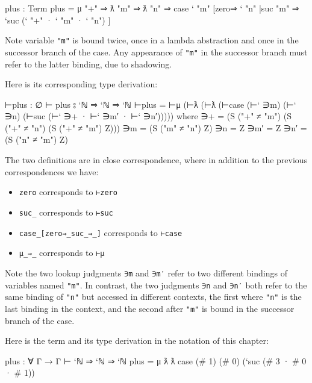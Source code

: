 \begin{myDisplay}
plus : Term
plus = μ "+" ⇒ ƛ "m" ⇒ ƛ "n" ⇒
         case ` "m"
           [zero⇒ ` "n"
           |suc "m" ⇒ `suc (` "+" · ` "m" · ` "n") ]
\end{myDisplay}

Note variable \texttt{"m"} is bound twice, once in a lambda abstraction
and once in the successor branch of the case. Any appearance of
\texttt{"m"} in the successor branch must refer to the latter binding,
due to shadowing.

Here is its corresponding type derivation:

\begin{myDisplay}
⊢plus : ∅ ⊢ plus ⦂ `ℕ ⇒ `ℕ ⇒ `ℕ
⊢plus = ⊢μ (⊢ƛ (⊢ƛ (⊢case (⊢` ∋m) (⊢` ∋n)
         (⊢suc (⊢` ∋+ · ⊢` ∋m′ · ⊢` ∋n′)))))
  where
  ∋+  = (S ("+" ≠ "m") (S ("+" ≠ "n") (S ("+" ≠ "m") Z)))
  ∋m  = (S ("m" ≠ "n") Z)
  ∋n  = Z
  ∋m′ = Z
  ∋n′ = (S ("n" ≠ "m") Z)
\end{myDisplay}

The two definitions are in close correspondence, where in addition to
the previous correspondences we have:

\begin{itemize}
\tightlist
\item
  \texttt{\textasciigrave{}zero} corresponds to \texttt{⊢zero}
\item
  \texttt{\textasciigrave{}suc\_} corresponds to \texttt{⊢suc}
\item
  \texttt{case\_{[}zero⇒\_\textbar{}suc\_⇒\_{]}} corresponds to
  \texttt{⊢case}
\item
  \texttt{μ\_⇒\_} corresponds to \texttt{⊢μ}
\end{itemize}

Note the two lookup judgments \texttt{∋m} and \texttt{∋m′} refer to two
different bindings of variables named \texttt{"m"}. In contrast, the two
judgments \texttt{∋n} and \texttt{∋n′} both refer to the same binding of
\texttt{"n"} but accessed in different contexts, the first where
\texttt{"n"} is the last binding in the context, and the second after
\texttt{"m"} is bound in the successor branch of the case.

Here is the term and its type derivation in the notation of this
chapter:

\begin{myDisplay}
plus : ∀ {Γ} → Γ ⊢ `ℕ ⇒ `ℕ ⇒ `ℕ
plus = μ ƛ ƛ case (# 1) (# 0) (`suc (# 3 · # 0 · # 1))
\end{myDisplay}

